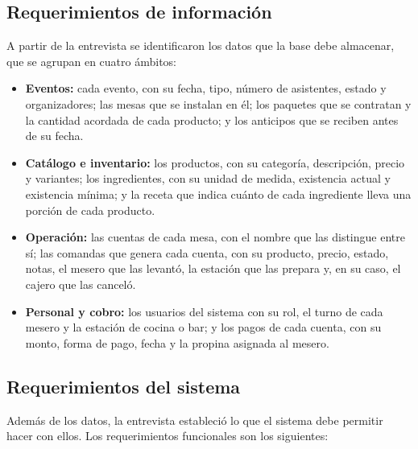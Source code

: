 \subsection{Requerimientos de información}

A partir de la entrevista se identificaron los datos que la base debe almacenar, que se agrupan en cuatro ámbitos:

\begin{itemize}
    \item \textbf{Eventos:} cada evento, con su fecha, tipo, número de asistentes, estado y organizadores; las mesas que se instalan en él; los paquetes que se contratan y la cantidad acordada de cada producto; y los anticipos que se reciben antes de su fecha.
    \item \textbf{Catálogo e inventario:} los productos, con su categoría, descripción, precio y variantes; los ingredientes, con su unidad de medida, existencia actual y existencia mínima; y la receta que indica cuánto de cada ingrediente lleva una porción de cada producto.
    \item \textbf{Operación:} las cuentas de cada mesa, con el nombre que las distingue entre sí; las comandas que genera cada cuenta, con su producto, precio, estado, notas, el mesero que las levantó, la estación que las prepara y, en su caso, el cajero que las canceló.
    \item \textbf{Personal y cobro:} los usuarios del sistema con su rol, el turno de cada mesero y la estación de cocina o bar; y los pagos de cada cuenta, con su monto, forma de pago, fecha y la propina asignada al mesero.
\end{itemize}

\subsection{Requerimientos del sistema}

Además de los datos, la entrevista estableció lo que el sistema debe permitir hacer con ellos. Los requerimientos funcionales son los siguientes:

